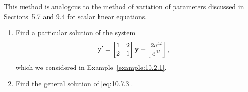 \documentclass{ximera}
\begin{document}
This method is analogous
to the method of variation of parameters discussed in
Sections~5.7 and 9.4 for scalar linear
equations.

\begin{example}\label{example:10.7.1} 
\begin{enumerate}
\item\label{item:10.7.1a} %
Find a particular solution of the system
\begin{equation} \label{eq:10.7.3}
{\bf y}'=\begin{bmatrix}1&2\\2&1\end{bmatrix}{\bf y}+\begin{bmatrix}2e^{4t}\\e^{4t}
\end{bmatrix},
\end{equation}
which we considered in Example~\ref{example:10.2.1}.
\item\label{item:10.7.1b} %
Find the general solution of  \eqref{eq:10.7.3}.
\end{enumerate}


\end{example}
\end{document}
